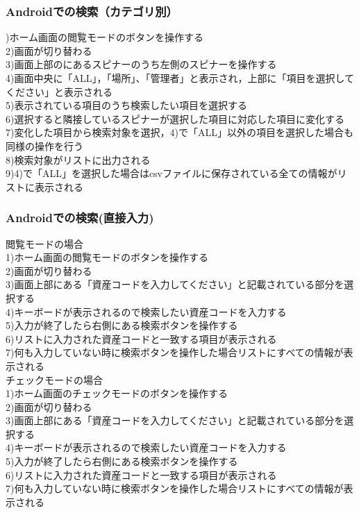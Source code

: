 \documentclass[11pt,a4j]{jarticle}
\begin{document}
\subsubsection{Androidでの検索（カテゴリ別）}
)ホーム画面の閲覧モードのボタンを操作する
\\2)画面が切り替わる
\\3)画面上部のにあるスピナーのうち左側のスピナーを操作する
\\4)画面中央に「ALL」，「場所」、「管理者」と表示され，上部に「項目を選択してください」と表示される
\\5)表示されている項目のうち検索したい項目を選択する
\\6)選択すると隣接しているスピナーが選択した項目に対応した項目に変化する
\\7)変化した項目から検索対象を選択，4)で「ALL」以外の項目を選択した場合も同様の操作を行う
\\8)検索対象がリストに出力される
\\9)4)で「ALL」を選択した場合はcsvファイルに保存されている全ての情報がリストに表示される

\subsubsection{Androidでの検索(直接入力)}
\noindent
{閲覧モードの場合}
\\1)ホーム画面の閲覧モードのボタンを操作する
\\2)画面が切り替わる
\\3)画面上部にある「資産コードを入力してください」と記載されている部分を選択する
\\4)キーボードが表示されるので検索したい資産コードを入力する
\\5)入力が終了したら右側にある検索ボタンを操作する
\\6)リストに入力された資産コードと一致する項目が表示される
\\7)何も入力していない時に検索ボタンを操作した場合リストにすべての情報が表示される
\noindent
\\
{チェックモードの場合}
\\1)ホーム画面のチェックモードのボタンを操作する
\\2)画面が切り替わる
\\3)画面上部にある「資産コードを入力してください」と記載されている部分を選択する
\\4)キーボードが表示されるので検索したい資産コードを入力する
\\5)入力が終了したら右側にある検索ボタンを操作する
\\6)リストに入力された資産コードと一致する項目が表示される
\\7)何も入力していない時に検索ボタンを操作した場合リストにすべての情報が表示される
\end{document}
